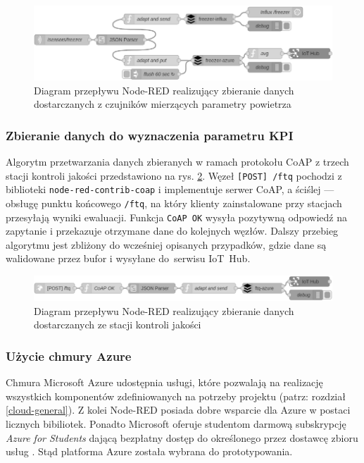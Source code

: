 \documentclass[a4paper, 12pt, twoside]{article}
\begin{document}
\begin{figure}[h]
      \centering
      \includegraphics[width=\textwidth]{flow1.png}
      \caption{Diagram przepływu Node-RED realizujący zbieranie danych dostarczanych z czujników mierzących parametry powietrza}
      \label{fig:flow1}
\end{figure}

\subsubsection{Zbieranie danych do wyznaczenia parametru KPI }

Algorytm przetwarzania danych zbieranych w ramach protokołu CoAP z trzech stacji
kontroli jakości przedstawiono na rys. \ref{fig:flow2}. Węzeł \texttt{[POST] /ftq}
pochodzi z biblioteki \texttt{node-red-contrib-coap} i implementuje serwer CoAP,
a ściślej --- obsługę punktu końcowego \texttt{/ftq}, na który klienty zainstalowane
przy stacjach przesyłają wyniki ewaluacji. Funkcja \texttt{CoAP OK}
wysyła pozytywną odpowiedź na zapytanie i przekazuje otrzymane dane do kolejnych węzłów.
Dalszy przebieg algorytmu jest zbliżony do wcześniej opisanych przypadków,
gdzie dane są walidowane przez bufor i wysyłane do~serwisu IoT~Hub.

\begin{figure}[h]
      \centering
      \includegraphics[width=\textwidth]{flow2.png}
      \caption{Diagram przepływu Node-RED realizujący zbieranie danych dostarczanych ze stacji kontroli jakości}
      \label{fig:flow2}
\end{figure}


\subsubsection{Użycie chmury Azure}

Chmura Microsoft Azure udostępnia usługi, które pozwalają na realizację wszystkich komponentów zdefiniowanych
na potrzeby projektu (patrz: rozdział \ref{cloud-general}).
Z kolei Node-RED posiada dobre wsparcie dla Azure w postaci licznych bibiliotek.
Ponadto Microsoft oferuje studentom darmową subskrypcję \emph{Azure for Students}
dającą bezpłatny dostęp do określonego przez dostawcę zbioru usług \cite{azure-students}.
Stąd platforma Azure została wybrana do prototypowania.
\end{document}
